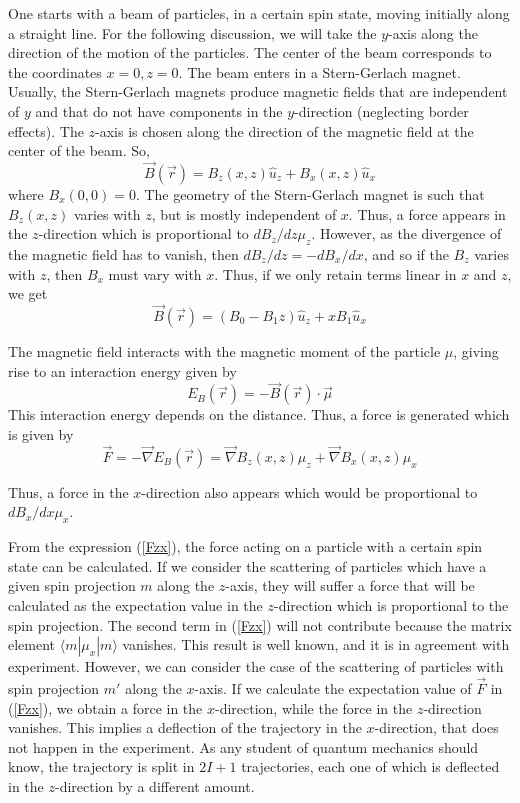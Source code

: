 \documentclass[aps,preprint,prl]{revtex4-2}
\def\grad{\vec\nabla}
\newcommand{\be}{\begin{equation}}
\newcommand{\ee}{\end{equation}}
\begin{document}
One starts with a beam of 
particles, in a certain spin state, moving initially along a straight line. 
For the following discussion, 
we will take the $y$-axis along the direction of the motion of the particles.
The center of the beam corresponds to the coordinates $x=0, z=0$.
The beam enters in a Stern-Gerlach magnet.
Usually, the Stern-Gerlach magnets produce magnetic fields that are independent
of $y$  and that do not have components in the
$y$-direction (neglecting border effects). 
The $z$-axis is chosen along the direction of the magnetic field at the 
center of the beam. So,
\be
\vec B(\vec r) = B_z(x,z) \hat u_z + B_x(x,z) \hat u_x
\ee
where $B_x(0,0)=0$.
The geometry of the Stern-Gerlach magnet is such that $B_z(x,z)$ varies with 
 $z$, but is mostly independent of $x$. Thus, a force appears in 
the $z$-direction which is proportional
to $dB_z/dz \mu_z$. However, as the divergence of 
the magnetic field has to vanish, then $dB_z/dz=-dB_x/dx$, and so if the
$B_z$ varies with  $z$, then $B_x$ must vary with  $x$. Thus, if we only retain
terms linear in $x$ and $z$, we get
\be
\vec{B}(\vec r) = (B_0 - B_1 z)\hat{u}_z + x B_1 \hat u_x
\ee

The magnetic field interacts with the magnetic moment of the
particle $\mu$, giving rise to an interaction energy given by
\be
E_B(\vec r) = - \vec B(\vec r) \cdot \vec \mu
\ee
This interaction energy depends on the distance. Thus, a  force is generated
which is given by
\be
\vec F = -\grad E_B(\vec r) = \grad B_z(x,z) \mu_z + \grad B_x(x,z) \mu_x
\label{Fzx}
\ee

Thus, a force in the $x$-direction also appears which would be 
proportional to $dB_x/dx \mu_x$.


From the expression (\ref{Fzx}), the force acting on a particle with a certain 
spin state can be calculated. If we consider the scattering of particles which
have a given spin projection $m$ along the $z$-axis, they will suffer a force
that will be calculated as the expectation value
in the $z$-direction which is proportional to the spin projection. The second
term  in (\ref{Fzx}) will not contribute because the matrix element
$\langle m|\mu_x| m \rangle$ vanishes. This result is well known, and it is in agreement
with experiment. However, we can consider the case of the scattering of
particles with spin projection $m'$ along the $x$-axis. If we calculate the
expectation value of $\vec F$ in (\ref{Fzx}), we  obtain a force in the
$x$-direction, while the force in the $z$-direction vanishes. This  implies a
deflection of the trajectory in the $x$-direction, that does not  happen
in the experiment. As any student of quantum mechanics should know, the 
trajectory is split in $2I+1$ trajectories, each one of which is deflected
in the $z$-direction by a different amount.
\end{document}
